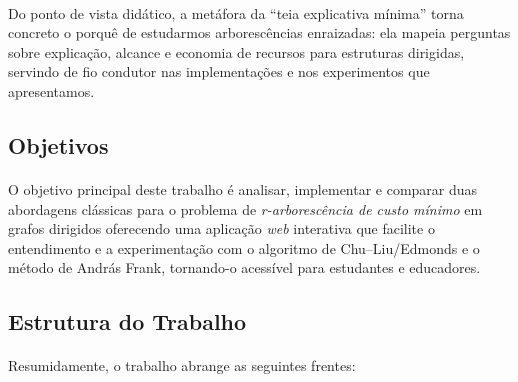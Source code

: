 \documentclass[12pt,a4paper]{article}
\begin{document}
\paragraph{}
Do ponto de vista didático, a metáfora da “teia explicativa mínima” torna concreto o porquê de estudarmos arborescências enraizadas: ela mapeia perguntas sobre explicação, alcance e economia de recursos para estruturas dirigidas, servindo de fio condutor nas implementações e nos experimentos que apresentamos.

\subsection{Objetivos}

\paragraph{}
O objetivo principal deste trabalho é analisar, implementar e comparar duas abordagens clássicas para o problema de \textit{r-arborescência de custo mínimo} em grafos dirigidos oferecendo uma aplicação \textit{web} interativa que facilite o entendimento e a experimentação com o algoritmo de Chu--Liu/Edmonds e o método de András Frank, tornando-o acessível para estudantes e educadores.

\subsection{Estrutura do Trabalho}
\paragraph{}
Resumidamente, o trabalho abrange as seguintes frentes:
\end{document}
